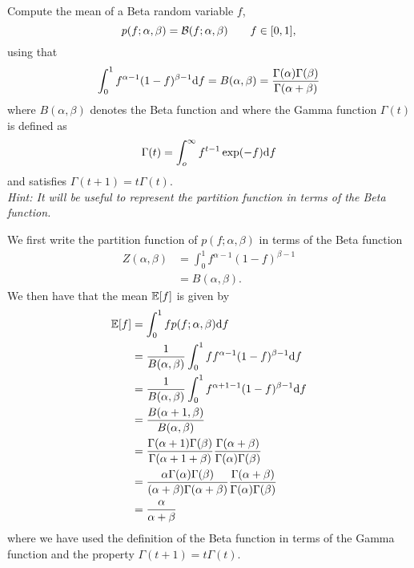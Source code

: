 \begin{exenumerate}
  
\item \label{q:mean-beta-var} Compute the mean of a Beta random variable $f$,
  \begin{equation}
    p(f; \alpha, \beta) =  \mathcal{B}(f ; \alpha, \beta) \quad \quad f \in [0,1],
  \end{equation}
  using that
    \begin{equation}
    \int_0^1 f^{\alpha-1} (1-f)^{\beta-1} \mathrm{d} f = B(\alpha, \beta) = \frac{\Gamma(\alpha)\Gamma(\beta)}{\Gamma(\alpha+\beta)}
  \end{equation}
  where $ B(\alpha, \beta)$ denotes the Beta function and where the Gamma function $\Gamma(t)$ is defined as
  \begin{equation}
    \Gamma(t) = \int_o^\infty f^{t-1} \exp(-f) \mathrm{d} f
  \end{equation}
  and satisfies $\Gamma(t+1) = t \Gamma(t)$.\\
  \emph{Hint: It will be useful to represent the partition function in terms of the Beta function.}

  \begin{solution}
    We first write the partition function of $p(f; \alpha, \beta)$ in terms of the Beta function
    \begin{align}
      Z(\alpha, \beta) &= \int_0^1 f^{\alpha-1} (1-f)^{\beta-1}\\
      & =  B(\alpha, \beta).
    \end{align}
    We then have that the mean $\mathbb{E}[f]$ is given by
    \begin{align}
      \mathbb{E}[f] & = \int_0^1 f p(f; \alpha, \beta) \mathrm{d} f \\
      & = \frac{1}{B(\alpha, \beta)} \int_0^1 f  f^{\alpha-1} (1-f)^{\beta-1} \mathrm{d} f\\
      & = \frac{1}{B(\alpha, \beta)} \int_0^1 f^{\alpha+1-1} (1-f)^{\beta-1} \mathrm{d} f\\
      & = \frac{B(\alpha+1, \beta)}{B(\alpha, \beta)} \\
      & = \frac{\Gamma(\alpha+1)\Gamma(\beta)}{\Gamma(\alpha+1+\beta)} \frac{\Gamma(\alpha+\beta)}{\Gamma(\alpha)\Gamma(\beta)}\\
      & = \frac{\alpha \Gamma(\alpha)\Gamma(\beta)}{(\alpha+\beta) \Gamma(\alpha+\beta)} \frac{\Gamma(\alpha+\beta)}{\Gamma(\alpha)\Gamma(\beta)}\\
      & = \frac{\alpha}{\alpha+\beta}
      \label{eq:mean-beta-var}
    \end{align}
    where we have used the definition of the Beta function in terms of the Gamma function and the property $\Gamma(t+1) = t \Gamma(t)$.
  \end{solution}
  

\end{exenumerate}
